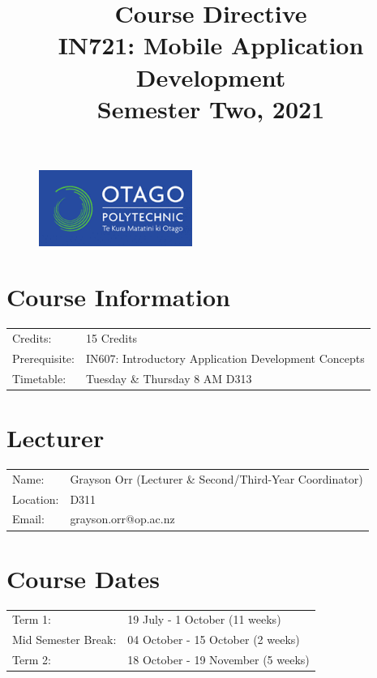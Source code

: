 \documentclass{article}
\author{}
\begin{document}
 

\begin{figure}
	\includegraphics[width=50mm]{../../resources/img/logo.png}
\end{figure} 

\title{Course Directive\\IN721: Mobile Application Development\\Semester Two, 2021}
\date{}
\maketitle

\section*{Course Information}
\begin{tabular}{ll}
	Credits:                      & 15 Credits                                                                   \\
	Prerequisite:                 & IN607: Introductory Application Development Concepts \\
	Timetable:  & Tuesday \& Thursday 8 AM D313                                                         \\
\end{tabular}

\section*{Lecturer}
\begin{tabular}{ll}
	Name:     & Grayson Orr (Lecturer \& Second/Third-Year Coordinator) \\
	Location: & D311                   \\
	Email:    & grayson.orr@op.ac.nz   \\
\end{tabular}

\section*{Course Dates}
\begin{tabular}{ll}
	Term 1:             & 19 July - 1 October (11 weeks) \\
	Mid Semester Break: & 04 October - 15 October (2 weeks)    \\
	Term 2:             & 18 October - 19 November (5 weeks)        \\     
\end{tabular}
\end{document}
